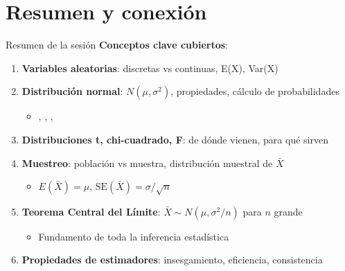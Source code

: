 \documentclass[aspectratio=169, 11pt]{beamer}
\begin{document}
\section{Resumen y conexión}

\begin{frame}{Resumen de la sesión}
\textbf{Conceptos clave cubiertos}:

\begin{enumerate}
\item \textbf{Variables aleatorias}: discretas vs continuas, E(X), Var(X)
\item \textbf{Distribución normal}: $N(\mu, \sigma^2)$, propiedades, cálculo de probabilidades
  \begin{itemize}
  \item {}, , , 
  \end{itemize}
\item \textbf{Distribuciones t, chi-cuadrado, F}: de dónde vienen, para qué sirven
\item \textbf{Muestreo}: población vs muestra, distribución muestral de $\bar{X}$
  \begin{itemize}
  \item $E(\bar{X}) = \mu$, $\text{SE}(\bar{X}) = \sigma/\sqrt{n}$
  \end{itemize}
\item \textbf{Teorema Central del Límite}: $\bar{X} \sim N(\mu, \sigma^2/n)$ para $n$ grande
  \begin{itemize}
  \item Fundamento de toda la inferencia estadística
  \end{itemize}
\item \textbf{Propiedades de estimadores}: insesgamiento, eficiencia, consistencia
\end{enumerate}
\end{frame}
\end{document}
